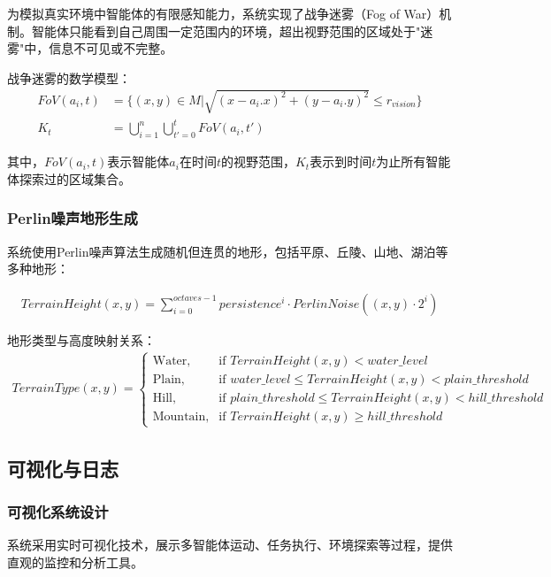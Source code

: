 \documentclass[12pt,a4paper]{article}
\begin{document}
为模拟真实环境中智能体的有限感知能力，系统实现了战争迷雾（Fog of War）机制。智能体只能看到自己周围一定范围内的环境，超出视野范围的区域处于"迷雾"中，信息不可见或不完整。

战争迷雾的数学模型：
\begin{align}
FoV(a_i, t) &= \{(x,y) \in M | \sqrt{(x-a_i.x)^2 + (y-a_i.y)^2} \leq r_{vision}\} \\
K_t &= \bigcup_{i=1}^{n} \bigcup_{t'=0}^{t} FoV(a_i, t')
\end{align}

其中，$FoV(a_i, t)$表示智能体$a_i$在时间$t$的视野范围，$K_t$表示到时间$t$为止所有智能体探索过的区域集合。

\subsubsection{Perlin噪声地形生成}

系统使用Perlin噪声算法生成随机但连贯的地形，包括平原、丘陵、山地、湖泊等多种地形：

\begin{align}
TerrainHeight(x,y) = \sum_{i=0}^{octaves-1} persistence^i \cdot PerlinNoise((x,y) \cdot 2^i)
\end{align}

地形类型与高度映射关系：
\begin{align}
TerrainType(x,y) = 
\begin{cases}
\text{Water}, & \text{if } TerrainHeight(x,y) < water\_level \\
\text{Plain}, & \text{if } water\_level \leq TerrainHeight(x,y) < plain\_threshold \\
\text{Hill}, & \text{if } plain\_threshold \leq TerrainHeight(x,y) < hill\_threshold \\
\text{Mountain}, & \text{if } TerrainHeight(x,y) \geq hill\_threshold
\end{cases}
\end{align}

\subsection{可视化与日志}

\subsubsection{可视化系统设计}

系统采用实时可视化技术，展示多智能体运动、任务执行、环境探索等过程，提供直观的监控和分析工具。
\end{document}
